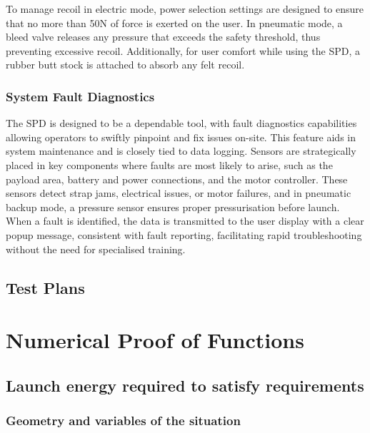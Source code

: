 \documentclass[a4paper,10pt]{article} %
\begin{document}
To manage recoil in electric mode, power selection settings are designed to ensure that no more than 50N of force is exerted on the user. In pneumatic mode, a bleed valve releases any pressure that exceeds the safety threshold, thus preventing excessive recoil. Additionally, for user comfort while using the SPD, a rubber butt stock is attached to absorb any felt recoil.

\subsubsection{System Fault Diagnostics} %

The SPD is designed to be a dependable tool, with fault diagnostics capabilities allowing operators to swiftly pinpoint and fix issues on-site. This feature aids in system maintenance and is closely tied to data logging. Sensors are strategically placed in key components where faults are most likely to arise, such as the payload area, battery and power connections, and the motor controller. These sensors detect strap jams, electrical issues, or motor failures, and in pneumatic backup mode, a pressure sensor ensures proper pressurisation before launch. When a fault is identified, the data is transmitted to the user display with a clear popup message, consistent with fault reporting, facilitating rapid troubleshooting without the need for specialised training.

\newpage

\subsection{Test Plans}



\newpage

\section{Numerical Proof of Functions}

\subsection{Launch energy required to satisfy requirements}

\subsubsection{Geometry and variables of the situation}
\end{document}
